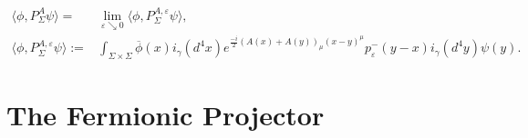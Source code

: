 \documentclass[a4paper,11pt]{article}
\begin{document}
\begin{align}
\langle \phi, P^A_\Sigma \psi\rangle =& \lim_{\varepsilon \searrow 0} \langle \phi, P^{A,\varepsilon}_\Sigma \psi\rangle ,\\
\langle \phi, P^{A,\varepsilon}_\Sigma \psi\rangle :=&
\int_{\Sigma\times\Sigma}\overline{\phi}(x)i_\gamma(d^4x) 
e^{\frac{-i}{2}(A(x)+A(y))_\mu(x-y)^\mu} p^-_\varepsilon(y-x)i_\gamma(d^4y) \psi(y).
\end{align}


\section{The Fermionic Projector}






\end{document}
